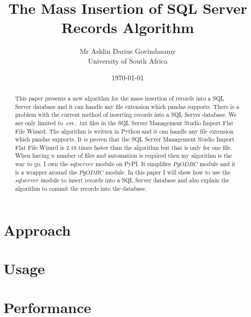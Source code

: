 \documentclass{report}
\title{The Mass Insertion of SQL Server Records Algorithm}
\author{Mr Ashlin Darius Govindasamy\\ \large{University of South Africa}}
\date{\today}
\begin{document}
\maketitle
\newpage

\begin{abstract}
    This paper presents a new algorithm for the mass insertion of records into a SQL Server database and it can handle any file extension which pandas supports.
    There is a problem with the current method of inserting records into a SQL Server database. We are only limited to .csv, .txt files in the SQL Server Management Studio Import Flat File Wizard.
    The algorithm is written in Python and it can handle any file extension which pandas supports.
    It is proven that the SQL Server Management Studio Import Flat File Wizard is $2.18$ times faster than the algorithm but that is only for one file.
    When having $n$ number of files and automation is required then my algorithm is the way to go. I own the $sqlserver$ module on PyPI.
    It simplifies $PyODBC$ module and it is a wrapper around the $PyODBC$ module. In this paper I will show how to use the $sqlserver$ module to insert records into a SQL Server database and also explain the algorithm to commit the records into the database.
\end{abstract}

\tableofcontents


\chapter{Approach}


\chapter{Usage}


\chapter{Performance}


\newpage
\end{document}
